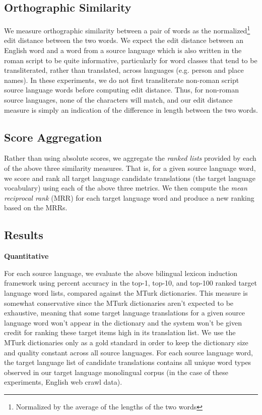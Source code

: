 \documentclass[11pt]{article}
\begin{document}
\subsection{Orthographic Similarity} 
We measure orthographic similarity between a pair of words as the normalized\footnote{Normalized by the average of the lengths of the two words} edit distance between the two words. We expect the edit distance between an English word and a word from a source language which is also written in the roman script to be quite informative, particularly for word classes that tend to be transliterated, rather than translated, across languages (e.g. person and place names). In these experiments, we do not first transliterate non-roman script source language words before computing edit distance. Thus, for non-roman source languages, none of the characters will match, and our edit distance measure is simply an indication of the difference in length between the two words. 

\subsection{Score Aggregation} 
Rather than using absolute scores, we aggregate the {\it ranked lists} provided by each of the above three similarity measures. That is, for a given source language word, we score and rank all target language candidate translations (the target language vocabulary) using each of the above three metrics. We then compute the {\it mean reciprocal rank} (MRR) for each target language word and produce a new ranking based on the MRRs.

\subsection{Results}

{\bf Quantitative} 

For each source language, we evaluate the above bilingual lexicon induction framework using percent accuracy in the top-1, top-10, and top-100 ranked target language word lists, compared against the MTurk dictionaries. This measure is somewhat conservative since the MTurk dictionaries aren't expected to be exhaustive, meaning that some target language translations for a given source language word won't appear in the dictionary and the system won't be given credit for ranking these target items high in its translation list. We use the MTurk dictionaries only as a gold standard in order to keep the dictionary size and quality constant across all source languages. For each source language word, the target language list of candidate translations contains all unique word types observed in our target language monolingual corpus (in the case of these experiments, English web crawl data). 
\end{document}
